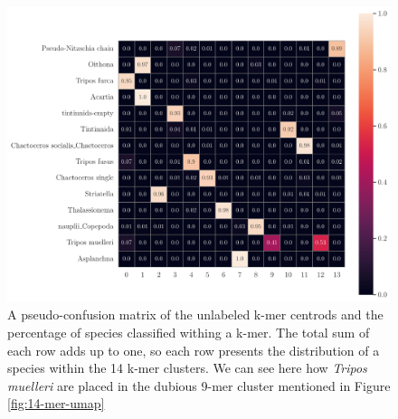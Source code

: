 \begin{figure}[H]
    \centering
    \includegraphics[width=1\linewidth]{latex/figures/dinov2_confmat.pdf}
    \caption{A pseudo-confusion matrix of the unlabeled k-mer centrods and the percentage of species classified withing a k-mer. The total sum of each row adds up to one, so each row presents the distribution of a species within the 14 k-mer clusters. We can see here how \textit{Tripos muelleri} are placed in the dubious 9-mer cluster mentioned in Figure \ref{fig:14-mer-umap}}
    \label{fig:dinov2-confusion}
\end{figure}

